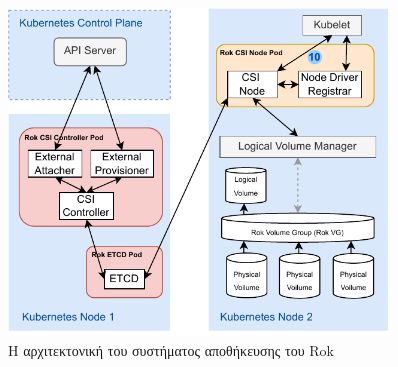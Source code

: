 \begin{figure}[ht]
      \centering
      \includegraphics[width=0.9\textwidth]{resources/rok-csi-architecture.pdf}
      \caption{Η αρχιτεκτονική του συστήματος αποθήκευσης του Rok}
      \label{figure:gr-rok-csi-architecture}
\end{figure}
